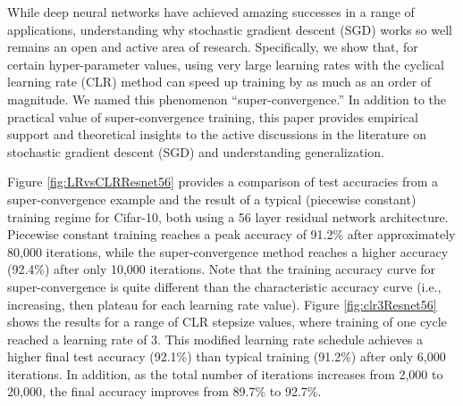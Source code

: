 \documentclass{article}
\begin{document}
While deep neural networks have achieved amazing successes in a range of applications, understanding why  stochastic gradient descent (SGD) works so well remains an open and active area of research.
Specifically, we show that, for certain hyper-parameter values, using very large learning rates with the cyclical learning rate (CLR) method \citep{smith2015no, smith2017cyclical} can speed up training by as much as an order of magnitude. 
We named this phenomenon ``super-convergence.''
In addition to the practical value of super-convergence training, this paper provides empirical support and theoretical insights to the active discussions in the literature on stochastic gradient descent (SGD) and understanding generalization.

Figure \ref{fig:LRvsCLRResnet56} provides a comparison of test accuracies from a super-convergence example and the result of a typical (piecewise constant) training regime for Cifar-10, both using a 56 layer residual network architecture.
Piecewise constant training reaches a peak accuracy of 91.2\% after approximately 80,000 iterations, while the super-convergence method reaches a higher accuracy (92.4\%) after only 10,000 iterations.
Note that the training accuracy curve for super-convergence is quite different than the characteristic accuracy curve (i.e., increasing, then plateau for each learning rate value). 
Figure \ref{fig:clr3Resnet56} shows the results for a range of CLR stepsize values, where training of one cycle reached a learning rate of 3.
This modified learning rate schedule achieves a higher final test accuracy (92.1\%) than typical training (91.2\%) after only 6,000 iterations.
In addition, as the total number of iterations increases from 2,000 to 20,000, the final accuracy improves from 89.7\% to 92.7\%.
\end{document}
